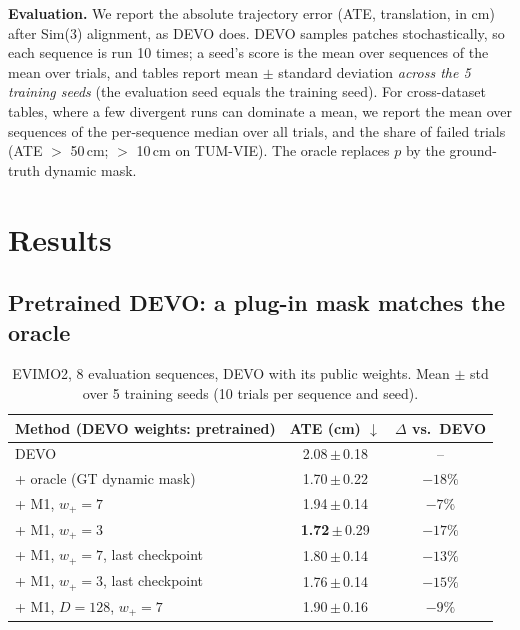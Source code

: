 \documentclass[conference]{IEEEtran}
\newcommand{\best}[1]{\textbf{#1}}
\newcommand{\pmstd}[2]{#1\,$\pm$\,#2}
\newcommand{\wplus}{w_{+}}
\begin{document}
\textbf{Evaluation.} We report the absolute trajectory error (ATE, translation, in cm)
after Sim(3) alignment, as DEVO does. DEVO samples patches stochastically, so each sequence
is run 10 times; a seed's score is the mean over sequences of the mean over trials, and
tables report mean $\pm$ standard deviation \emph{across the 5 training seeds} (the
evaluation seed equals the training seed). For cross-dataset tables, where a few divergent
runs can dominate a mean, we report the mean over sequences of the per-sequence median over
all trials, and the share of failed trials (ATE $>$ 50\,cm; $>$ 10\,cm on TUM-VIE). The
oracle replaces $p$ by the ground-truth dynamic mask.

\section{Results}\label{sec:results}

\subsection{Pretrained DEVO: a plug-in mask matches the oracle}

\begin{table}[t]
\centering
\caption{EVIMO2, 8 evaluation sequences, DEVO with its public weights. Mean $\pm$ std
over 5 training seeds (10 trials per sequence and seed).}
\label{tab:pretrained}
\begin{tabular}{lcc}
\toprule
Method (DEVO weights: pretrained) & ATE (cm) $\downarrow$ & $\Delta$ vs.\ DEVO \\
\midrule
DEVO~\cite{klenk2024devo} & \pmstd{2.08}{0.18} & -- \\
+ oracle (GT dynamic mask) & \pmstd{1.70}{0.22} & $-18\%$ \\
\midrule
+ M1, $\wplus = 7$ & \pmstd{1.94}{0.14} & $-7\%$ \\
+ M1, $\wplus = 3$ & \pmstd{\best{1.72}}{0.29} & \best{$-17\%$} \\
+ M1, $\wplus = 7$, last checkpoint & \pmstd{1.80}{0.14} & $-13\%$ \\
+ M1, $\wplus = 3$, last checkpoint & \pmstd{1.76}{0.14} & $-15\%$ \\
+ M1, $D = 128$, $\wplus = 7$ & \pmstd{1.90}{0.16} & $-9\%$ \\
\bottomrule
\end{tabular}
\end{table}
\end{document}
